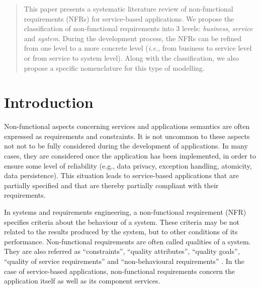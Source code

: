 \documentclass{sig-alternate}
\begin{document}
\maketitle
\begin{abstract}
This paper presents a systematic literature review of non-functional
requirements (NFRs) for service-based applications. 
We propose the classification of non-functional requirements into 3 levels:
\textit{business}, \textit{service} and \textit{system}. 
During the development process, the NFRs can be refined from 
one level to a more concrete level (\textit{i.e.}, from business to service
level or from service to system level). Along with the classification, we also
propose a specific nomenclature for this type of modelling. 
\end{abstract}




\section{Introduction}

Non-functional aspects concerning services and applications semantics are often
expressed as requirements and constraints.
It is not uncommon to these aspects not not to be fully considered during the development of applications.
In many cases, they are considered once the
application has been implemented, in order to ensure some
level of reliability (e.g., data privacy, exception handling,
atomicity, data persistence). 
This situation leads to service-based
applications that are partially specified and that are thereby
partially compliant with their requirements. 

In systems and requirements engineering, a non-functional
requirement (NFR) specifies criteria about the behaviour of a
system. 
These criteria may be not related to the results produced by the system,
but to other conditions of its performance. 
Non-functional requirements are often called qualities of a system. 
They are also referred as ``constraints'', ``quality attributes'', ``quality goals'', ``quality of
service requirements'' and ``non-behavioural requirements'' \cite{Stellman2005}. 
In the case of service-based applications, non-functional requirements concern
the application itself as well as its component services. 
 
\end{document}
